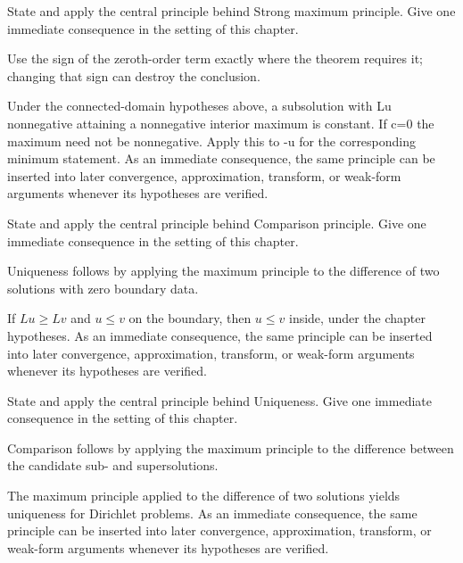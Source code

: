 \begin{exercise}\label{exr:iii27-03}
State and apply the central principle behind Strong maximum principle. Give one immediate consequence in the setting of this chapter.
\end{exercise}
\begin{hint}
Use the sign of the zeroth-order term exactly where the theorem requires it; changing that sign can destroy the conclusion.
\end{hint}
\begin{solution}
Under the connected-domain hypotheses above, a subsolution with Lu nonnegative attaining a nonnegative interior maximum is constant. If c=0 the maximum need not be nonnegative. Apply this to -u for the corresponding minimum statement. As an immediate consequence, the same principle can be inserted into later convergence, approximation, transform, or weak-form arguments whenever its hypotheses are verified.
\end{solution}

\begin{exercise}\label{exr:iii27-04}
State and apply the central principle behind Comparison principle. Give one immediate consequence in the setting of this chapter.
\end{exercise}
\begin{hint}
Uniqueness follows by applying the maximum principle to the difference of two solutions with zero boundary data.
\end{hint}
\begin{solution}
If $Lu\ge Lv$ and $u\le v$ on the boundary, then $u\le v$ inside, under the chapter hypotheses. As an immediate consequence, the same principle can be inserted into later convergence, approximation, transform, or weak-form arguments whenever its hypotheses are verified.
\end{solution}

\begin{exercise}\label{exr:iii27-05}
State and apply the central principle behind Uniqueness. Give one immediate consequence in the setting of this chapter.
\end{exercise}
\begin{hint}
Comparison follows by applying the maximum principle to the difference between the candidate sub- and supersolutions.
\end{hint}
\begin{solution}
The maximum principle applied to the difference of two solutions yields uniqueness for Dirichlet problems. As an immediate consequence, the same principle can be inserted into later convergence, approximation, transform, or weak-form arguments whenever its hypotheses are verified.
\end{solution}

